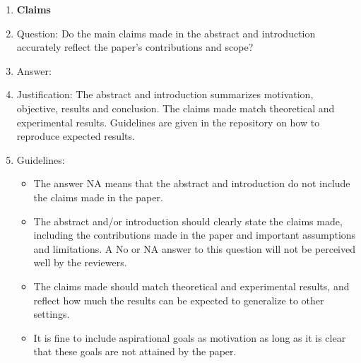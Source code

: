 \documentclass{article}
\begin{document}
 



\begin{enumerate}

\item {\bf Claims}
    \item[] Question: Do the main claims made in the abstract and introduction accurately reflect the paper's contributions and scope?
    \item[] Answer: \answerYes{} %
    \item[] Justification: The abstract and introduction summarizes motivation, objective, results and conclusion. The claims made match theoretical and experimental results. Guidelines are given in the repository on how to reproduce expected results.
    \item[] Guidelines:
    \begin{itemize}
        \item The answer NA means that the abstract and introduction do not include the claims made in the paper.
        \item The abstract and/or introduction should clearly state the claims made, including the contributions made in the paper and important assumptions and limitations. A No or NA answer to this question will not be perceived well by the reviewers. 
        \item The claims made should match theoretical and experimental results, and reflect how much the results can be expected to generalize to other settings. 
        \item It is fine to include aspirational goals as motivation as long as it is clear that these goals are not attained by the paper. 
    \end{itemize}


\end{enumerate}
\end{document}
